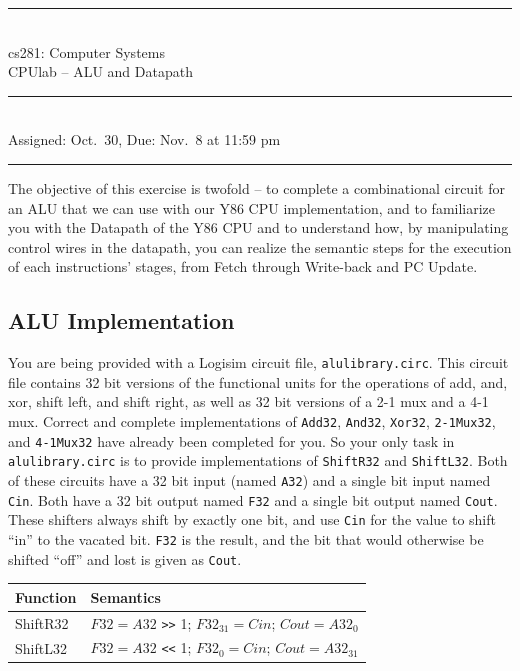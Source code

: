 \documentclass[11pt]{article}
\newcommand{\HRule}{\rule{\linewidth}{0.3mm}}
\begin{document}
\vspace*{-1.1in}
\begin{center}
\HRule \\
\vspace{0.04in}
cs281: Computer Systems\\
\vspace{0.03in}
\Large{CPUlab -- ALU and Datapath}
\normalsize
\vspace*{-0.04in}
\HRule \\
\vspace{.05in}
Assigned: Oct.~30, Due: Nov.~8 at 11:59 pm\\
\rule{2.75in}{0.01in}

\end{center}

The objective of this exercise is twofold -- to complete a combinational circuit for an ALU that we can use with our Y86 CPU implementation, and to familiarize you with the Datapath of the Y86 CPU and to understand how, by manipulating control wires in the datapath, you can realize the semantic steps for the execution of each instructions' stages, from Fetch through Write-back and PC Update.

\subsection*{ALU Implementation}
You are being provided with a Logisim circuit file, \texttt{alulibrary.circ}.  This circuit file contains 32 bit versions of the functional units for the operations of add, and, xor, shift left, and shift right, as well as 32 bit versions of a 2-1 mux and a 4-1 mux.  Correct and complete implementations of \texttt{Add32}, \texttt{And32}, \texttt{Xor32}, \texttt{2-1Mux32}, and \texttt{4-1Mux32} have already been completed for you.  So your only task in \texttt{alulibrary.circ} is to provide implementations of \texttt{ShiftR32} and \texttt{ShiftL32}.  Both of these circuits have a 32 bit input (named \texttt{A32}) and a single bit input named \texttt{Cin}.  Both have a 32 bit output named \texttt{F32} and a single bit output named \texttt{Cout}.  These shifters always shift by exactly one bit, and use \texttt{Cin} for the value to shift ``in'' to the vacated bit. \texttt{F32} is the result, and the bit that would otherwise be shifted ``off'' and lost is given as \texttt{Cout}.

\begin{center}
\begin{tabular}{|l|l|}
\hline
Function & Semantics \\
\hline \hline
ShiftR32 & $F32 = A32$ \verb+>>+ 1; $F32_{31} = Cin$; $Cout = A32_0$ \\ \hline
ShiftL32 & $F32 = A32$ \verb+<<+ 1; $F32_{0} = Cin$; $Cout = A32_{31}$ \\
\hline
\end{tabular}
\end{center}
\end{document}

